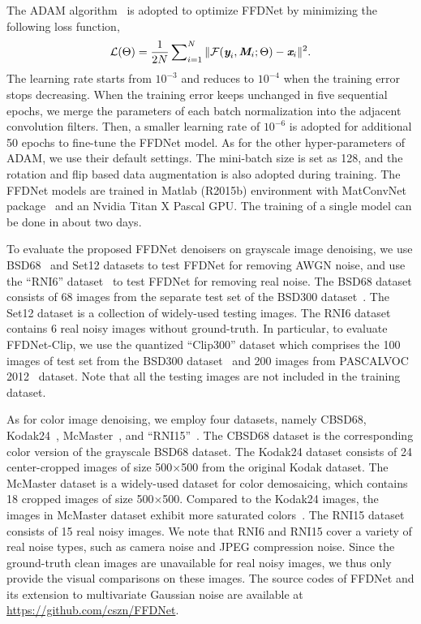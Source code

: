 \documentclass[journal]{IEEEtran}
\begin{document}
The ADAM algorithm~\cite{kingma2014adam} is adopted to optimize FFDNet by minimizing the following loss function,
\begin{equation}\label{eq:loss}
  \mathcal{L}(\Theta) = \frac{1}{2N}\sum\nolimits_{i=1}^N\|\mathcal{F}(\emph{\textbf{y}}_i, \emph{\textbf{M}}_{i}; \Theta)  - \emph{\textbf{x}}_i \|^2.
\end{equation}
The learning rate starts from $10^{-3}$ and reduces to $10^{-4}$ when the training error stops decreasing. When the training error keeps unchanged in five sequential epochs, we merge the parameters of each batch normalization into the adjacent convolution filters. Then, a smaller learning rate of $10^{-6}$ is adopted for additional 50 epochs to fine-tune the FFDNet model.
As for the other hyper-parameters of ADAM, we use their default settings. The mini-batch size is set as 128, and the rotation and flip based data augmentation is also adopted during training. The FFDNet models are trained in Matlab (R2015b) environment with MatConvNet package~\cite{vedaldi2015matconvnet} and an Nvidia Titan X Pascal GPU.
The training of a single model can be done in about two days.


To evaluate the proposed FFDNet denoisers on grayscale image denoising, we use BSD68~\cite{roth2005fields} and Set12 datasets to test FFDNet for removing AWGN noise, and use the ``RNI6'' dataset~\cite{lebrun2015noise} to test FFDNet for removing real noise.
The BSD68 dataset consists of 68 images from the separate test set of the BSD300 dataset~\cite{MartinFTM01}. The Set12 dataset is a collection of widely-used testing images. The RNI6 dataset contains 6 real noisy images without ground-truth.
In particular, to evaluate FFDNet-Clip, we use the quantized ``Clip300'' dataset which comprises the 100 images of test set from the BSD300 dataset~\cite{MartinFTM01} and 200 images from PASCALVOC 2012~\cite{Everingham2015} dataset. Note that all the testing images are not included in the training dataset.


As for color image denoising, we employ four datasets, namely CBSD68, Kodak24~\cite{franzen1999kodak}, McMaster~\cite{zhang2011color}, and ``RNI15''~\cite{lebrun2015noise,RNI1}.
The CBSD68 dataset is the corresponding color version of the grayscale BSD68 dataset. The Kodak24 dataset consists of 24 center-cropped images of size 500$\times$500 from the original Kodak dataset. The McMaster dataset is a widely-used dataset for color demosaicing, which contains 18 cropped images of size 500$\times$500.
Compared to the Kodak24 images, the images in McMaster dataset exhibit more saturated colors~\cite{zhang2011color}.
The RNI15 dataset consists of 15 real noisy images. We note that RNI6 and RNI15 cover a variety of real noise types, such as camera noise and JPEG compression noise. Since the ground-truth clean images are unavailable for real noisy images, we thus only provide the visual comparisons on these images. The source codes of FFDNet and its extension to multivariate Gaussian noise are available at \url{https://github.com/cszn/FFDNet}.
\end{document}

